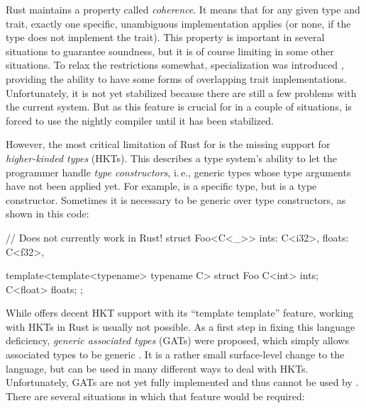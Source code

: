 Rust maintains a property called \emph{coherence}.
It means that for any given type and trait, exactly one specific, unambiguous implementation applies (or none, if the type does not implement the trait).
This property is important in several situations to guarantee soundness, but it is of course limiting in some other situations.
To relax the restrictions somewhat, specialization was introduced \cite{rfc1210}, providing the ability to have some forms of overlapping trait implementations.
Unfortunately, it is not yet stabilized because there are still a few problems with the current system.
But as this feature is crucial for  in a couple of situations,  is forced to use the nightly compiler until it has been stabilized.

\vfill

However, the most critical limitation of Rust for  is the missing support for \emph{higher-kinded types} (HKTs).
This describes a type system's ability to let the programmer handle \emph{type constructors}, i.\,e., generic types whose type arguments have not been applied yet.
For example,  is a specific type, but  is a type constructor.
Sometimes it is necessary to be generic over type constructors, as shown in this code:

\vspace{5mm}
\begin{minipage}{0.47\textwidth}
  \begin{rustcode}
    // Does not currently work in Rust!
    struct Foo<C<_>> {
        ints: C<i32>,
        floats: C<f32>,
    }
  \end{rustcode}
\end{minipage}
\begin{minipage}{0.51\textwidth}
  \begin{cppcode}
    template<template<typename> typename C>
    struct Foo {
        C<int> ints;
        C<float> floats;
    };
  \end{cppcode}
\end{minipage}

\newpage
While \cpp offers decent HKT support with its \enquote{template template} feature, working with HKTs in Rust is usually not possible.
As a first step in fixing this language deficiency, \emph{generic associated types} (GATs) were proposed, which simply allows associated types to be generic \cite{rfc1598}.
It is a rather small surface-level change to the language, but can be used in many different ways to deal with HKTs.
Unfortunately, GATs are not yet fully implemented and thus cannot be used by .
There are several situations in which that feature would be required:

